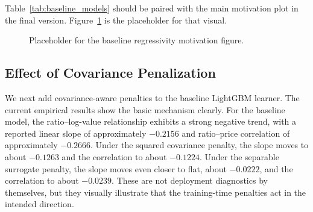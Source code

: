 \documentclass[12pt]{article}
\theoremstyle{plain}
\theoremstyle{definition}
\begin{document}
\begin{table}[t]
\centering
\caption{Baseline comparison on the test set. Lower is better for MAE, COD, and COV. For VEI and PRB, values closer to zero are preferred; for PRD and MKI, values closer to one are preferred.}
\label{tab:baseline_models}
\end{table}

Table~\ref{tab:baseline_models} should be paired with the main motivation plot in the final version. Figure~\ref{fig:baseline_regressivity_placeholder} is the placeholder for that visual.

\begin{figure}[t]
\centering
{}
\caption{Placeholder for the baseline regressivity motivation figure.}
\label{fig:baseline_regressivity_placeholder}
\end{figure}

\subsection{Effect of Covariance Penalization}

We next add covariance-aware penalties to the baseline LightGBM learner. The current empirical results show the basic mechanism clearly. For the baseline model, the ratio--log-value relationship exhibits a strong negative trend, with a reported linear slope of approximately \(-0.2156\) and ratio--price correlation of approximately \(-0.2666\). Under the squared covariance penalty, the slope moves to about \(-0.1263\) and the correlation to about \(-0.1224\). Under the separable surrogate penalty, the slope moves even closer to flat, about \(-0.0222\), and the correlation to about \(-0.0239\). These are not deployment diagnostics by themselves, but they visually illustrate that the training-time penalties act in the intended direction.
\end{document}
